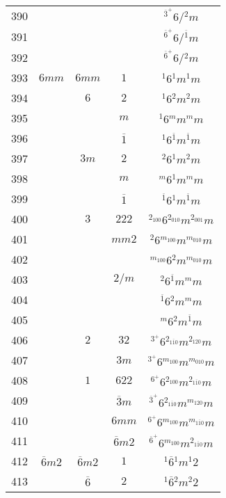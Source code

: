 \begin{longtable}{ccccc}
  390 &  &  &  & ${}^{\overline{3}^{+}} 6  / {}^{2} m $\\
  391 &  &  &  & ${}^{\overline{6}^{+}} 6  / {}^{\overline{1}} m $\\
  392 &  &  &  & ${}^{\overline{6}^{+}} 6  / {}^{2} m $\\
  393 & $6mm$ & $6mm$ & $1$ & ${}^{1} 6 {}^{1} m {}^{1} m $\\
  394 &  & $6$ & $2$ & ${}^{1} 6 {}^{2} m {}^{2} m $\\
  395 &  &  & $m$ & ${}^{1} 6 {}^{m} m {}^{m} m $\\
  396 &  &  & $\overline{1}$ & ${}^{1} 6 {}^{\overline{1}} m {}^{\overline{1}} m $\\
  397 &  & $3m$ & $2$ & ${}^{2} 6 {}^{1} m {}^{2} m $\\
  398 &  &  & $m$ & ${}^{m} 6 {}^{1} m {}^{m} m $\\
  399 &  &  & $\overline{1}$ & ${}^{\overline{1}} 6 {}^{1} m {}^{\overline{1}} m $\\
  400 &  & $3$ & $222$ & ${}^{2_{100}} 6 {}^{2_{010}} m {}^{2_{001}} m $\\
  401 &  &  & $mm2$ & ${}^{2} 6 {}^{m_{100}} m {}^{m_{010}} m $\\
  402 &  &  &  & ${}^{m_{100}} 6 {}^{2} m {}^{m_{010}} m $\\
  403 &  &  & $2/m$ & ${}^{2} 6 {}^{\overline{1}} m {}^{m} m $\\
  404 &  &  &  & ${}^{\overline{1}} 6 {}^{2} m {}^{m} m $\\
  405 &  &  &  & ${}^{m} 6 {}^{2} m {}^{\overline{1}} m $\\
  406 &  & $2$ & $32$ & ${}^{3^{+}} 6 {}^{2_{1\overline{1}0}} m {}^{2_{120}} m $\\
  407 &  &  & $3m$ & ${}^{3^{+}} 6 {}^{m_{100}} m {}^{m_{010}} m $\\
  408 &  & $1$ & $622$ & ${}^{6^{+}} 6 {}^{2_{100}} m {}^{2_{1\overline{1}0}} m $\\
  409 &  &  & $\overline{3}m$ & ${}^{\overline{3}^{+}} 6 {}^{2_{1\overline{1}0}} m {}^{m_{120}} m $\\
  410 &  &  & $6mm$ & ${}^{6^{+}} 6 {}^{m_{100}} m {}^{m_{1\overline{1}0}} m $\\
  411 &  &  & $\overline{6}m2$ & ${}^{\overline{6}^{+}} 6 {}^{m_{100}} m {}^{2_{1\overline{1}0}} m $\\
  412 & $\overline{6}m2$ & $\overline{6}m2$ & $1$ & ${}^{1} \overline{6} {}^{1} m {}^{1} 2 $\\
  413 &  & $\overline{6}$ & $2$ & ${}^{1} \overline{6} {}^{2} m {}^{2} 2 $\\

\end{longtable}
